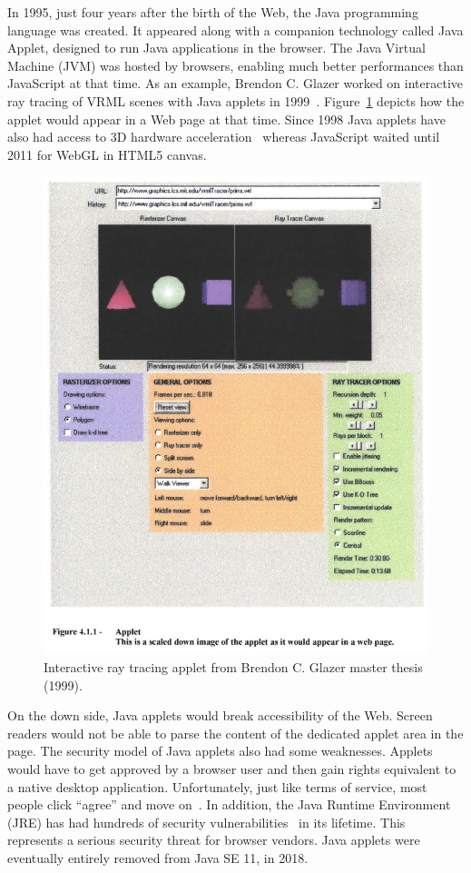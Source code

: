 In 1995, just four years after the birth of the Web,
the Java programming language was created.
It appeared along with a companion technology called Java Applet,
designed to run Java applications in the browser.
The Java Virtual Machine (JVM) was hosted by browsers,
enabling much better performances than JavaScript at that time.
As an example, Brendon C. Glazer worked on interactive ray tracing
of VRML scenes with Java applets in 1999~\cite{Glazer1999InteractiveRT}.
Figure~\ref{fig:glazer-thesis} depicts how the applet would appear
in a Web page at that time.
Since 1998 Java applets have also had access to 3D hardware acceleration~\cite{Java3dAPISpec}
whereas JavaScript waited until 2011 for WebGL in HTML5 canvas.

\begin{figure}[h!]
	\centering
	\includegraphics[width=\linewidth]{assets/img/glazer-thesis.jpg}
	\caption{Interactive ray tracing applet from Brendon C. Glazer master thesis (1999).}%
	\label{fig:glazer-thesis}
\end{figure}

On the down side, Java applets would break accessibility of the Web.
Screen readers would not be able to parse the content of the dedicated
applet area in the page.
The security model of Java applets also had some weaknesses.
Applets would have to get approved by a browser user and then gain rights
equivalent to a native desktop application.
Unfortunately, just like terms of service,
most people click ``agree'' and move on~\cite{obar2018biggest}.
In addition, the Java Runtime Environment (JRE) has had hundreds of security
vulnerabilities~\cite{JreCve} in its lifetime.
This represents a serious security threat for browser vendors.
Java applets were eventually entirely removed from Java SE 11, in 2018.

